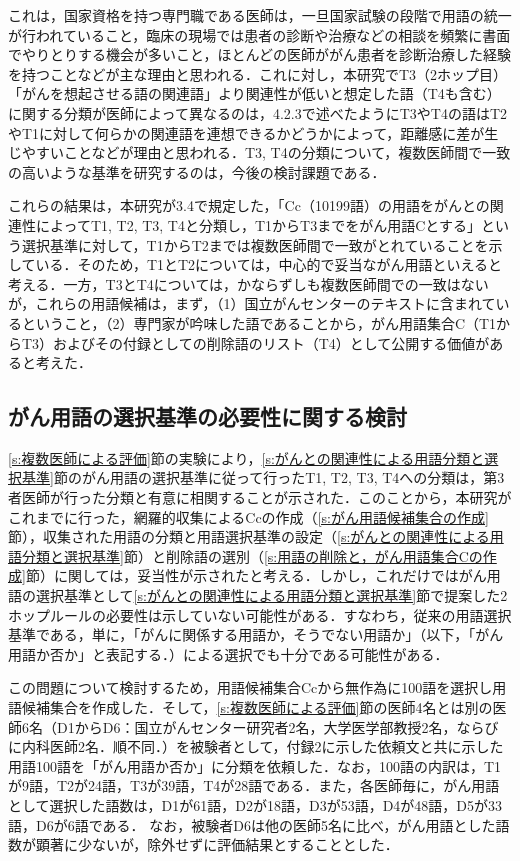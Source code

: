 \documentclass[japanese]{jnlp_1.4}
\begin{document}
これは，国家資格を持つ専門職である医師は，一旦国家試験の段階で用語の統一が行われていること，臨床の現場では患者の診断や治療などの相談を頻繁に書面でやりとりする機会が多いこと，ほとんどの医師ががん患者を診断治療した経験を持つことなどが主な理由と思われる．これに対し，本研究でT3（2ホップ目）「がんを想起させる語の関連語」より関連性が低いと想定した語（T4も含む）に関する分類が医師によって異なるのは，4.2.3で述べたようにT3やT4の語はT2やT1に対して何らかの関連語を連想できるかどうかによって，距離感に差が生じやすいことなどが理由と思われる．T3, T4の分類について，複数医師間で一致の高いような基準を研究するのは，今後の検討課題である．

これらの結果は，本研究が3.4で規定した，「Cc（10199語）の用語をがんとの関連性によってT1, T2, T3, T4と分類し，T1からT3までをがん用語Cとする」という選択基準に対して，T1からT2までは複数医師間で一致がとれていることを示している．そのため，T1とT2については，中心的で妥当ながん用語といえると考える．一方，T3とT4については，かならずしも複数医師間での一致はないが，これらの用語候補は，まず，（1）国立がんセンターのテキストに含まれているということ，（2）専門家が吟味した語であることから，がん用語集合C（T1からT3）およびその付録としての削除語のリスト（T4）として公開する価値があると考えた．


\subsection{がん用語の選択基準の必要性に関する検討}
\label{s:がん用語の選択基準の必要性に関する検討}

\ref{s:複数医師による評価}節の実験により，\ref{s:がんとの関連性による用語分類と選択基準}節のがん用語の選択基準に従って行ったT1, T2, T3, T4への分類は，第3者医師が行った分類と有意に相関することが示された．このことから，本研究がこれまでに行った，網羅的収集によるCcの作成（\ref{s:がん用語候補集合の作成}節），収集された用語の分類と用語選択基準の設定（\ref{s:がんとの関連性による用語分類と選択基準}節）と削除語の選別（\ref{s:用語の削除と，がん用語集合Cの作成}節）に関しては，妥当性が示されたと考える．しかし，これだけではがん用語の選択基準として\ref{s:がんとの関連性による用語分類と選択基準}節で提案した2ホップルールの必要性は示していない可能性がある．すなわち，従来の用語選択基準である，単に，「がんに関係する用語か，そうでない用語か」（以下，「がん用語か否か」と表記する．）による選択でも十分である可能性がある．

この問題について検討するため，用語候補集合Ccから無作為に100語を選択し用語候補集合を作成した．そして，\ref{s:複数医師による評価}節の医師4名とは別の医師6名（D1からD6：国立がんセンター研究者2名，大学医学部教授2名，ならびに内科医師2名．順不同．）を被験者として，付録2に示した依頼文と共に示した用語100語を「がん用語か否か」に分類を依頼した．なお，100語の内訳は，T1が9語，T2が24語，T3が39語，T4が28語である．また，各医師毎に，がん用語として選択した語数は，D1が61語，D2が18語，D3が53語，D4が48語，D5が33語，D6が6語である．
なお，被験者D6は他の医師5名に比べ，がん用語とした語数が顕著に少ないが，除外せずに評価結果とすることとした．
\end{document}
